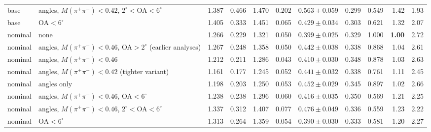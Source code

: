 \documentclass[11pt,a4paper]{article}
\newcommand{\Mpipi}{\ensuremath{M(\pi^{+}\pi^{-})}\xspace}
\begin{document}
\begin{table}[!htbp]
\begin{tabular}{@{}l >{\raggedright\arraybackslash}p{3.9cm} r r r r r r r r r@{}}
base & angles, \Mpipi$<0.42$, $2^\circ<$OA$<6^\circ$ & 1.387 & 0.466 & 1.470 & 0.202 & $0.563\pm0.059$ & 0.299 & 0.549 & 1.42 & 1.93 \\
base & OA$<6^\circ$ & 1.405 & 0.333 & 1.451 & 0.065 & $0.429\pm0.034$ & 0.303 & 0.621 & 1.32 & 2.07 \\
\midrule
nominal & none & 1.266 & 0.229 & 1.321 & 0.050 & $0.399\pm0.025$ & 0.329 & 1.000 & \textbf{1.00} & 2.72 \\
nominal & angles, \Mpipi$<0.46$, OA$>2^\circ$ (earlier analyses) & 1.267 & 0.248 & 1.358 & 0.050 & $0.442\pm0.038$ & 0.338 & 0.868 & 1.04 & 2.61 \\
nominal & angles, \Mpipi$<0.46$ & 1.212 & 0.211 & 1.286 & 0.043 & $0.410\pm0.030$ & 0.348 & 0.878 & 1.03 & 2.63 \\
nominal & angles, \Mpipi$<0.42$ (tighter variant) & 1.161 & 0.177 & 1.245 & 0.052 & $0.441\pm0.032$ & 0.338 & 0.761 & 1.11 & 2.45 \\
nominal & angles only & 1.198 & 0.203 & 1.250 & 0.053 & $0.452\pm0.029$ & 0.345 & 0.897 & 1.02 & 2.66 \\
nominal & angles, \Mpipi$<0.46$, OA$<6^\circ$ & 1.238 & 0.238 & 1.296 & 0.060 & $0.416\pm0.035$ & 0.350 & 0.569 & 1.21 & 2.25 \\
nominal & angles, \Mpipi$<0.46$, $2^\circ<$OA$<6^\circ$ & 1.337 & 0.312 & 1.407 & 0.077 & $0.476\pm0.049$ & 0.336 & 0.559 & 1.23 & 2.22 \\
nominal & OA$<6^\circ$ & 1.313 & 0.264 & 1.359 & 0.054 & $0.390\pm0.030$ & 0.333 & 0.581 & 1.20 & 2.27 \\
\bottomrule
\end{tabular}
\end{table}
\end{document}
